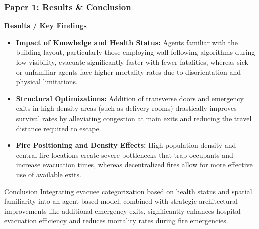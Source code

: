 \documentclass{beamer}
\begin{document}
\begin{frame}
\frametitle{Paper 1: Results \& Conclusion}
\scriptsize

\textbf{Results / Key Findings}
\begin{itemize}
    \item \textbf{Impact of Knowledge and Health Status:} Agents familiar with the building layout, particularly those employing wall-following algorithms during low visibility, evacuate significantly faster with fewer fatalities, whereas sick or unfamiliar agents face higher mortality rates due to disorientation and physical limitations.
    \item \textbf{Structural Optimizations:} Addition of transverse doors and emergency exits in high-density areas (such as delivery rooms) drastically improves survival rates by alleviating congestion at main exits and reducing the travel distance required to escape.
    \item \textbf{Fire Positioning and Density Effects:} High population density and central fire locations create severe bottlenecks that trap occupants and increase evacuation times, whereas decentralized fires allow for more effective use of available exits.
\end{itemize}

\begin{alertblock}{Conclusion}
Integrating evacuee categorization based on health status and spatial familiarity into an agent-based model, combined with strategic architectural improvements like additional emergency exits, significantly enhances hospital evacuation efficiency and reduces mortality rates during fire emergencies.
\end{alertblock}
\end{frame}
\end{document}
